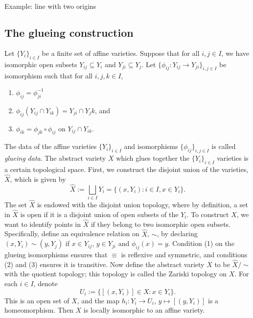 \documentclass[12pt]{amsart}
\theoremstyle{plain}
\begin{document}
Example: line with two origins

\subsection{The glueing construction}
Let $\{Y_i\}_{i\in I}$ be a finite set of affine varieties.
Suppose that for all $i, j \in I$, we have isomorphic open subsets $Y_{ij} \subseteq Y_i$ and $Y_{ji} \subseteq Y_j$.
Let $\{\phi_{ij} : Y_{ij} \to Y_{ji}\}_{i, j \in I}$ be isomorphism such that for all $i, j, k \in I$,
\begin{enumerate}
\item
$\phi_{ij} = \phi_{ji}^{-1}$

\item
$\phi_{ij}(Y_{ij} \cap Y_{ik}) = Y_{ji} \cap Y_jk$, and

\item
$\phi_{ik} = \phi_{jk} \circ \phi_{ij}$ on $Y_{ij} \cap Y_{ik}$.
\end{enumerate}
The data of the affine varieties $\{Y_i\}_{i\in I}$ and isomorphisms $\{\phi_{ij}\}_{i,j\in I}$ is called \emph{glueing data}.
The abstract variety $X$ which glues together the $\{Y_i\}_{i\in I}$ varieties is a certain topological space.
First, we construct the disjoint union of the varieties, $\hat X$, which is given by
$$\hat X := \bigsqcup_{i \in I} Y_i = \{(x, Y_i) : i \in I, x \in Y_i\}.$$
The set $\hat X$ is endowed with the disjoint union topology, where by definition, a set in $\hat X$ is open if it is a disjoint union of open subsets of the $Y_i$.
To construct $X$, we want to identify points in $\hat X$ if they belong to two isomorphic open subsets.
Specifically, define an equivalence relation on $\hat X$, $\sim$, by declaring $(x, Y_i) \sim (y, Y_j)$ if $x \in Y_{ij}$, $y\in Y_{ji}$ and $\phi_{ij}(x) = y$.
Condition (1) on the glueing isomorphisms ensures that $\equiv$ is reflexive and symmetric, and conditions (2) and (3) ensures it is transitive.
Now define the abstract variety $X$ to be $\hat X / \sim$ with the quotient topology;
this topology is called the Zariski topology on $X$.
For each $i \in I$, denote
$$U_i := \{[(x, Y_i)] \in X : x \in Y_i\}.$$
This is an open set of $X$, and the map $h_i : Y_i \to U_i$, $y \mapsto [(y, Y_i)]$ is a homeomorphism.
Then $X$ is locally isomorphic to an affine variety.
\end{document}
